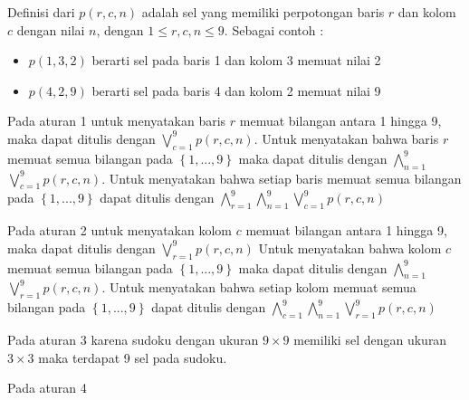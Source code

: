 Definisi dari $p\left(r,c,n\right)$ adalah sel yang memiliki perpotongan baris $r$ dan kolom $c$ dengan nilai $n$, dengan $1 \leq r,c,n \leq 9$. Sebagai contoh :

\begin{itemize}
	\item $p\left(1,3,2\right)$ berarti sel pada baris 1 dan kolom 3 memuat nilai 2
	\item $p\left(4,2,9\right)$ berarti sel pada baris 4 dan kolom 2 memuat nilai 9
\end{itemize}

Pada aturan 1 untuk menyatakan baris $r$ memuat bilangan antara 1 hingga 9, maka dapat ditulis dengan  $\bigvee_{c=1}^{9}$$p\left(r,c,n\right)$. Untuk menyatakan bahwa baris $r$ memuat semua bilangan pada $\left\{1,...,9\right\}$ maka dapat ditulis dengan $\bigwedge_{n=1}^{9}$$\bigvee_{c=1}^{9}$$p\left(r,c,n\right)$. Untuk menyatakan bahwa setiap baris memuat semua bilangan pada $\left\{1,...,9\right\}$ dapat ditulis dengan $\bigwedge_{r=1}^{9}$$\bigwedge_{n=1}^{9}$$\bigvee_{c=1}^{9}$$p\left(r,c,n\right)$

Pada aturan 2  untuk menyatakan kolom $c$ memuat bilangan antara 1 hingga 9, maka dapat ditulis dengan  $\bigvee_{r=1}^{9}$$p\left(r,c,n\right)$
Untuk menyatakan bahwa kolom $c$ memuat semua bilangan pada $\left\{1,...,9\right\}$ maka dapat ditulis dengan $\bigwedge_{n=1}^{9}$$\bigvee_{r=1}^{9}$$p\left(r,c,n\right)$. Untuk menyatakan bahwa setiap kolom memuat semua bilangan pada $\left\{1,...,9\right\}$ dapat ditulis dengan $\bigwedge_{c=1}^{9}$$\bigwedge_{n=1}^{9}$$\bigvee_{r=1}^{9}$$p\left(r,c,n\right)$
 
Pada aturan 3 karena sudoku dengan ukuran $9\times9$ memiliki sel dengan ukuran $3\times3$ maka terdapat 9 sel pada sudoku. 

Pada aturan 4